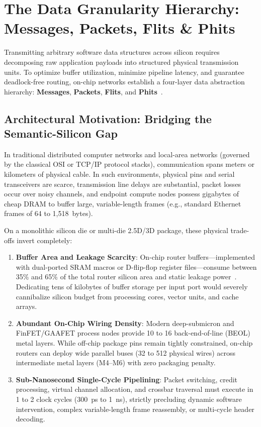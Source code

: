\section{The Data Granularity Hierarchy: Messages, Packets, Flits \& Phits}
\label{sec:ch2_granularity}

Transmitting arbitrary software data structures across silicon requires decomposing raw application payloads into structured physical transmission units. To optimize buffer utilization, minimize pipeline latency, and guarantee deadlock-free routing, on-chip networks establish a four-layer data abstraction hierarchy: \textbf{Messages}, \textbf{Packets}, \textbf{Flits}, and \textbf{Phits}~\cite{Dally2001,Benini2002}.

\subsection{Architectural Motivation: Bridging the Semantic-Silicon Gap}
\label{subsec:ch2_granularity_motivation}

In traditional distributed computer networks and local-area networks (governed by the classical OSI or TCP/IP protocol stacks), communication spans meters or kilometers of physical cable. In such environments, physical pins and serial transceivers are scarce, transmission line delays are substantial, packet losses occur over noisy channels, and endpoint compute nodes possess gigabytes of cheap DRAM to buffer large, variable-length frames (e.g., standard Ethernet frames of 64 to 1,518~bytes).

On a monolithic silicon die or multi-die 2.5D/3D package, these physical trade-offs invert completely:
\begin{enumerate}
    \item \textbf{Buffer Area and Leakage Scarcity}: On-chip router buffers---implemented with dual-ported SRAM macros or D-flip-flop register files---consume between 35\% and 65\% of the total router silicon area and static leakage power~\cite{Wang2002,Kahng2009,Peh2001}. Dedicating tens of kilobytes of buffer storage per input port would severely cannibalize silicon budget from processing cores, vector units, and cache arrays.
    \item \textbf{Abundant On-Chip Wiring Density}: Modern deep-submicron and FinFET/GAAFET process nodes provide 10 to 16 back-end-of-line (BEOL) metal layers. While off-chip package pins remain tightly constrained, on-chip routers can deploy wide parallel buses (32 to 512 physical wires) across intermediate metal layers (M4--M6) with zero packaging penalty.
    \item \textbf{Sub-Nanosecond Single-Cycle Pipelining}: Packet switching, credit processing, virtual channel allocation, and crossbar traversal must execute in 1 to 2 clock cycles (300~ps to 1~ns), strictly precluding dynamic software intervention, complex variable-length frame reassembly, or multi-cycle header decoding.
\end{enumerate}

